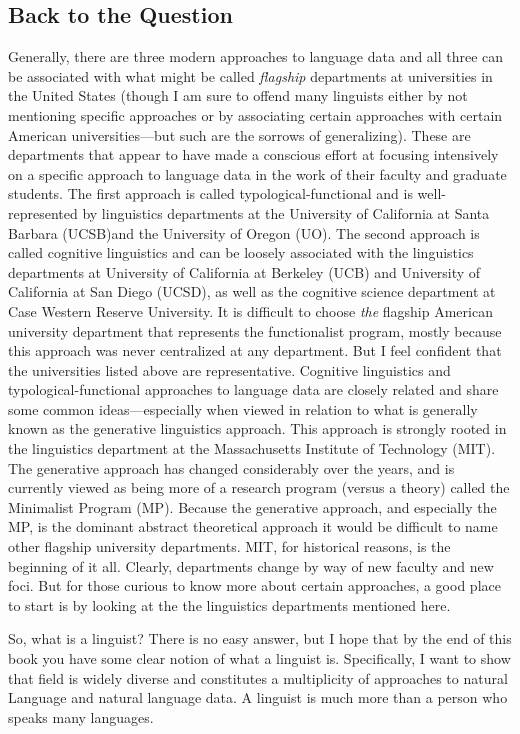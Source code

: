 \documentclass[11pt]{book}%
\theoremstyle{plain}
\numberwithin{equation}{section}
\theoremstyle{definition}
\newtheorem{phrase string}{Phrase String}
\begin{document}
\subsection{Back to the Question}
Generally, there are three  modern approaches to language data and all three can be associated with what might be called \textsl{flagship} departments at universities in the United States (though I am sure to offend many linguists either by not mentioning specific approaches or by associating certain approaches with certain American universities---but such are the sorrows of generalizing). These are departments that appear to have made a conscious effort at focusing intensively on a specific approach to language data in the work of their faculty and graduate students. The first approach is called typological-functional and is well-represented by linguistics departments at the University of California at Santa Barbara (UCSB)and the University of Oregon (UO). The second approach is called cognitive linguistics and can be loosely associated with the linguistics departments at University of California at Berkeley (UCB) and University of California at San Diego (UCSD), as well as the cognitive science department at Case Western Reserve University. It is difficult to choose \textsl{the} flagship American university department that represents the functionalist program, mostly because this approach was never centralized at any department. But I feel confident that the universities listed above are representative. Cognitive linguistics and typological-functional approaches to language data are closely related and share some common ideas---especially when viewed in relation to what is generally known as the generative linguistics approach. This approach is strongly rooted in the linguistics department at the Massachusetts Institute of Technology (MIT). The generative approach has changed considerably over the years, and is currently viewed as being more of a research program (versus a theory) called the Minimalist Program (MP). Because the generative approach, and especially the MP, is the dominant abstract theoretical approach it would be difficult to name other flagship university departments. MIT, for historical reasons, is the beginning of it all. Clearly, departments change by way of new faculty and new foci. But for those curious to know more about certain approaches, a good place to start is by looking at the the linguistics departments mentioned here. 

So, what is a linguist? There is no easy answer, but I hope that by the end of this book you have some clear notion of what a linguist is. Specifically, I want to show that field is widely diverse and constitutes a multiplicity of approaches to natural Language and natural language data. A linguist is much more than a person who speaks many languages.
\end{document}
